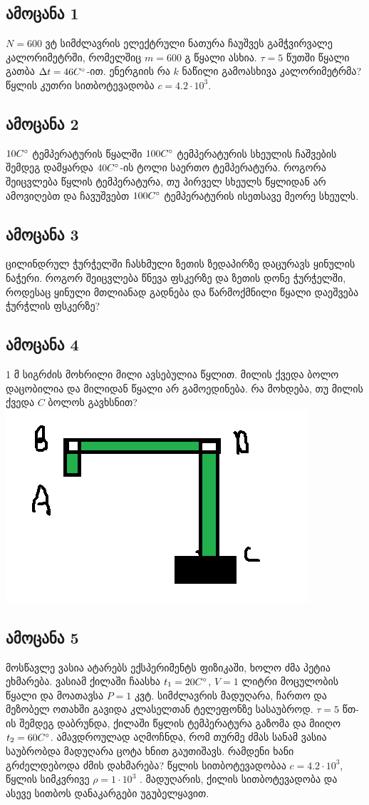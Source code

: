 \documentclass{article}
\begin{document}
\subsection{ამოცანა 1}
$N = 600$ ვტ სიმძლავრის ელექტრული ნათურა ჩაუშვეს გამჭვირვალე კალორიმეტრში, რომელშიც $m = 600$ გ წყალი ასხია. $\tau = 5$ წუთში წყალი გათბა $\Delta t = 46 C \degree$-ით. ენერგიის რა $k$ ნაწილი გამოასხივა კალორიმეტრმა? წყლის კუთრი სითბოტევადობა $c = 4.2 \cdot 10^3$.

\subsection{ამოცანა 2}
$10 C \degree$ ტემპერატურის წყალში $100 C \degree$ ტემპერატურის სხეულის ჩაშვების შემდეგ დამყარდა $40 C \degree$-ის ტოლი საერთო ტემპერატურა. როგორა შეიცვლება წყლის ტემპერატურა, თუ პირველ სხეულს წყლიდან არ ამოვიღებთ და ჩავუშვებთ $100 C \degree$ ტემპერატურის ისეთსავე მეორე სხეულს.

\subsection{ამოცანა 3}
ცილინდრულ ჭურჭელში ჩასხმული ზეთის ზედაპირზე დაცურავს ყინულის ნაჭერი. როგორ შეიცვლება წნევა ფსკერზე და ზეთის დონე ჭურჭელში, როდესაც ყინული მთლიანად გადნება და წარმოქმნილი წყალი დაეშვება ჭურჭლის ფსკერზე?

\subsection{ამოცანა 4}
1 მ სიგრძის მოხრილი მილი ავსებულია წყლით. მილის ქვედა ბოლო დაცობილია და მილიდან წყალი არ გამოედინება. რა მოხდება, თუ მილის ქვედა $C$ ბოლოს გავხსნით?
	\includegraphics[scale=0.4]{figures/problem_4}
	
\subsection{ამოცანა 5}	
მოსწავლე ვასია ატარებს ექსპერიმენტს ფიზიკაში, ხოლო ძმა პეტია ეხმარება. ვასიამ ქილაში ჩაასხა $t_1 = 20 C \degree$, $V = 1$ ლიტრი მოცულობის წყალი და მოათავსა $P = 1$ კვტ. სიმძლავრის მადუღარა, ჩართო და მეზობელ ოთახში გავიდა კლასელთან ტელეფონზე სასაუბროდ. $\tau = 5$ წთ-ის შემდეგ დაბრუნდა, ქილაში წყლის ტემპერატურა გაზომა და მიიღო $t_2 = 60 C \degree$. ამავდროულად აღმოჩნდა, რომ თურმე ძმას სანამ ვასია საუბრობდა მადუღარა ცოტა ხნით გაუთიშავს. რამდენი ხანი გრძელდებოდა ძმის დახმარება? წყლის სითბოტევადობაა $c = 4.2 \cdot 10^3$, წყლის სიმკვრივე $\rho = 1 \cdot 10^3$ . მადუღარის, ქილის სითბოტევადობა და ასევე სითბოს დანაკარგები უგუბელყავით. 
\end{document}
